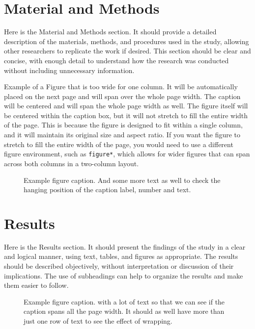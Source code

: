 \documentclass{forestrystudies}
\begin{document}
\section*{Material and Methods}

Here is the Material and Methods section. It should provide a detailed description of the materials, methods, and procedures used in the study, allowing other researchers to replicate the work if desired. This section should be clear and concise, with enough detail to understand how the research was conducted without including unnecessary information.

Example of a Figure that is too wide for one column. It will be automatically placed on the next page and will span over the whole page width. The caption will be centered and will span the whole page width as well. The figure itself will be centered within the caption box, but it will not stretch to fill the entire width of the page. This is because the figure is designed to fit within a single column, and it will maintain its original size and aspect ratio. If you want the figure to stretch to fill the entire width of the page, you would need to use a different figure environment, such as \texttt{figure*}, which allows for wider figures that can span across both columns in a two-column layout.

\begin{figure}[H]
  \centering
  \caption{Example figure caption. And some more text as well to check the hanging position of the caption label, number and text.}
\end{figure}

\section*{Results}

Here is the Results section. It should present the findings of the study in a clear and logical manner, using text, tables, and figures as appropriate. The results should be described objectively, without interpretation or discussion of their implications. The use of subheadings can help to organize the results and make them easier to follow.

\begin{figure}
  \centering
  \caption{Example figure caption. with a lot of text so that we can see if the caption spans all the page width. It should as well have more than just one row of text to see the effect of wrapping.}
\end{figure}
\end{document}
